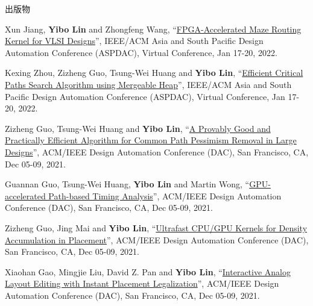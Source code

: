 \begin{rSection}{出版物}
\begin{description}[font=\normalfont, rightmargin=2em]
{}
            

\item[{[C56]}]{
        Xun Jiang, \textbf{Yibo Lin} and Zhongfeng Wang, 
    ``\href{https://doi.org/10.1109/ASP-DAC52403.2022.9712533}{FPGA-Accelerated Maze Routing Kernel for VLSI Designs}'', 
    IEEE/ACM Asia and South Pacific Design Automation Conference (ASPDAC), Virtual Conference, Jan 17-20, 2022.
    
}
            

\item[{[C55]}]{
        Kexing Zhou, Zizheng Guo, Tsung-Wei Huang and \textbf{Yibo Lin}, 
    ``\href{https://doi.org/10.1109/ASP-DAC52403.2022.9712566}{Efficient Critical Paths Search Algorithm using Mergeable Heap}'', 
    IEEE/ACM Asia and South Pacific Design Automation Conference (ASPDAC), Virtual Conference, Jan 17-20, 2022.
    
}
            

\item[{[C54]}]{
        Zizheng Guo, Tsung-Wei Huang and \textbf{Yibo Lin}, 
    ``\href{https://doi.org/10.1109/DAC18074.2021.9586085}{A Provably Good and Practically Efficient Algorithm for Common Path Pessimism Removal in Large Designs}'', 
    ACM/IEEE Design Automation Conference (DAC), San Francisco, CA, Dec 05-09, 2021.
    
}
            

\item[{[C53]}]{
        Guannan Guo, Tsung-Wei Huang, \textbf{Yibo Lin} and Martin Wong, 
    ``\href{https://doi.org/10.1109/DAC18074.2021.9586316}{GPU-accelerated Path-based Timing Analysis}'', 
    ACM/IEEE Design Automation Conference (DAC), San Francisco, CA, Dec 05-09, 2021.
    
}
            

\item[{[C52]}]{
        Zizheng Guo, Jing Mai and \textbf{Yibo Lin}, 
    ``\href{https://doi.org/10.1109/DAC18074.2021.9586149}{Ultrafast CPU/GPU Kernels for Density Accumulation in Placement}'', 
    ACM/IEEE Design Automation Conference (DAC), San Francisco, CA, Dec 05-09, 2021.
    
}
            

\item[{[C51]}]{
        Xiaohan Gao, Mingjie Liu, David Z. Pan and \textbf{Yibo Lin}, 
    ``\href{https://doi.org/10.1109/DAC18074.2021.9586234}{Interactive Analog Layout Editing with Instant Placement Legalization}'', 
    ACM/IEEE Design Automation Conference (DAC), San Francisco, CA, Dec 05-09, 2021.
    
}
\end{description}
\end{rSection}
